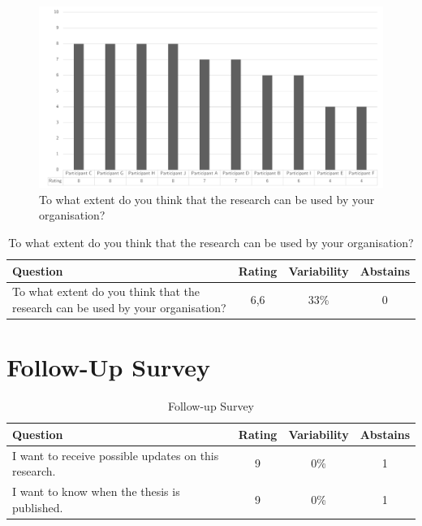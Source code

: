 \begin{figure}[H]
	\centering
	\includegraphics[width=0.9\linewidth]{images/validationresult_researchrelevanceorganisation}
	\caption[To what extent do you think that the research can be used by your organisation?]{To what extent do you think that the research can be used by your organisation?}
	\label{fig:validationrelevantorganisation}
\end{figure}
\begin{table}[H]
	\centering
	\begin{tabular}{p{}ccc}
		\toprule
		\textbf{Question} & \textbf{Rating} & \textbf{Variability} & \textbf{Abstains} \\
		\midrule
		To what extent do you think that the research can be used by your organisation? & 6,6 & 33\% & 0 \\%
		\bottomrule
	\end{tabular}%
	\caption[To what extent do you think that the research can be used by your organisation?]{To what extent do you think that the research can be used by your organisation?}
	\label{tab:validationrelevantorganisation}%
\end{table}%

\section{Follow-Up Survey}
\begin{table}[H]
	\centering
	\begin{tabular}{p{}ccc}
		\toprule
		\textbf{Question} & \textbf{Rating} & \textbf{Variability} & \textbf{Abstains} \\
		\midrule
		I want to receive possible updates on this research. & 9 & 0\% & 1 \\%
		I want to know when the thesis is published. & 9 & 0\% & 1 \\%
		\bottomrule
	\end{tabular}%
	\caption{Follow-up Survey}
	\label{tab:appfollowupsurvey}%
\end{table}%